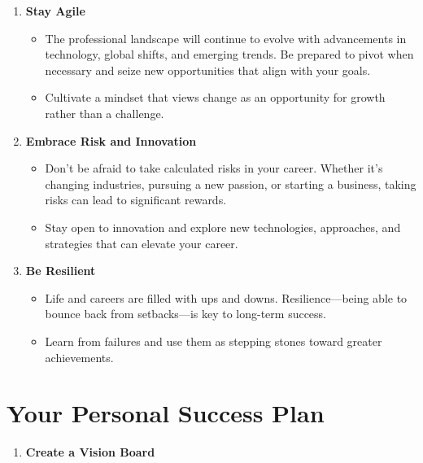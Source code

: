 \documentclass[
  letterpaper,
  DIV=11,
  numbers=noendperiod]{scrreprt}
\providecommand{\tightlist}{%
  \setlength{\itemsep}{0pt}\setlength{\parskip}{0pt}}\usepackage{longtable,booktabs,array}
\begin{document}
\begin{enumerate}
\def\labelenumi{\arabic{enumi}.}
\item
  \textbf{Stay Agile}

  \begin{itemize}
  \tightlist
  \item
    The professional landscape will continue to evolve with advancements
    in technology, global shifts, and emerging trends. Be prepared to
    pivot when necessary and seize new opportunities that align with
    your goals.
  \item
    Cultivate a mindset that views change as an opportunity for growth
    rather than a challenge.
  \end{itemize}
\item
  \textbf{Embrace Risk and Innovation}

  \begin{itemize}
  \tightlist
  \item
    Don't be afraid to take calculated risks in your career. Whether
    it's changing industries, pursuing a new passion, or starting a
    business, taking risks can lead to significant rewards.
  \item
    Stay open to innovation and explore new technologies, approaches,
    and strategies that can elevate your career.
  \end{itemize}
\item
  \textbf{Be Resilient}

  \begin{itemize}
  \tightlist
  \item
    Life and careers are filled with ups and downs. Resilience---being
    able to bounce back from setbacks---is key to long-term success.
  \item
    Learn from failures and use them as stepping stones toward greater
    achievements.
  \end{itemize}
\end{enumerate}

\section{Your Personal Success Plan}\label{your-personal-success-plan}

\begin{enumerate}
\def\labelenumi{\arabic{enumi}.}
\tightlist
\item
  \textbf{Create a Vision Board}
\end{enumerate}
\end{document}
